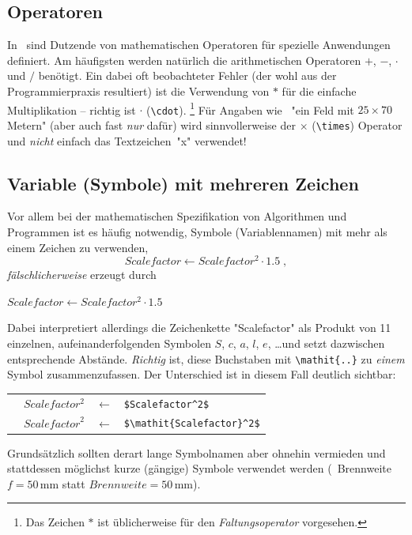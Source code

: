 \subsection{Operatoren}

In \latex\ sind Dutzende von mathematischen Operatoren für spezielle
Anwendungen definiert. Am häufigsten werden natürlich die arithmetischen
Operatoren $+$, $-$, $\cdot$ und $/$ benötigt. Ein dabei oft beobachteter
Fehler (der wohl aus der Programmierpraxis resultiert) ist die Verwendung von
$*$ für die einfache Multiplikation -- richtig ist $\cdot$ (\verb!\cdot!).%
\footnote{Das Zeichen $*$ ist üblicherweise für den \emph{Faltungsoperator}
vorgesehen.}
%
Für Angaben wie \zB\ "ein Feld mit $25 \times 70$ Metern" (aber auch fast
\emph{nur} dafür) wird sinnvollerweise der $\times$ (\verb!\times!) Operator
und \emph{nicht} einfach das Textzeichen~"x" verwendet!


\subsection{Variable (Symbole) mit mehreren Zeichen}

Vor allem bei der mathematischen Spezifikation von Algorithmen und Programmen
ist es häufig notwendig, Symbole (Variablennamen) mit mehr als einem Zeichen
zu verwenden, \zB
%
	\[Scalefactor\leftarrow Scalefactor^2 \cdot 1.5 \; ,\]
%
\emph{fälschlicherweise} erzeugt durch
%
\begin{LaTeXCode}[numbers=none]
$Scalefactor \leftarrow Scalefactor^2 \cdot 1.5$
\end{LaTeXCode}
%
Dabei interpretiert \latex allerdings die Zeichenkette "Scalefactor" als 
Produkt von 11 einzelnen, aufeinanderfolgenden Symbolen $S$, $c$, $a$, $l$,
$e$, \ldots und setzt dazwischen entsprechende Abstände. 
\emph{Richtig} ist, diese Buchstaben mit \verb!\mathit{..}! zu \emph{einem}
Symbol zusammenzufassen. Der Unterschied ist in diesem Fall deutlich sichtbar:
%
\begin{center}
	\setlength{\tabcolsep}{4pt}
	\begin{tabular}{llll}
		\text{Falsch:}  & $Scalefactor^2$          & $\leftarrow$ &
		\verb!$Scalefactor^2$!          \\
		\text{Richtig:} & $\mathit{Scalefactor}^2$ & $\leftarrow$ &
		\verb!$\mathit{Scalefactor}^2$!
	\end{tabular}
\end{center}
%
Grundsätzlich sollten derart lange Symbolnamen aber ohnehin vermieden und
stattdessen möglichst kurze (gängige) Symbole verwendet werden (\zB\
Brennweite $f = 50 \, \mathrm{mm}$ statt $\mathit{Brennweite} = 50 \,
\mathrm{mm}$).

